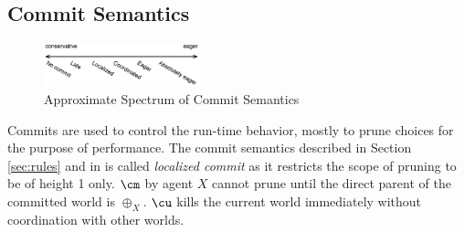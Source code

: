 \subsection{Commit Semantics}\label{sec:commit2}

\begin{figure}
  \centering
  \includegraphics[width=0.4\textwidth]{commit-spectrum}
  \caption{Approximate Spectrum of Commit Semantics}
  \label{fig:commit-spectrum}
\end{figure}

Commits are used to control the run-time behavior,
mostly to prune choices for the purpose of performance.
The commit semantics described in Section \ref{sec:rules} and
in  is called {\em localized commit} as it restricts
the scope of pruning to be of height 1 only.  $\cm$ by agent $X$ cannot
prune until the direct parent of the committed world is $\oplus_X$.
$\cu$ kills the current world immediately without coordination with other worlds.

